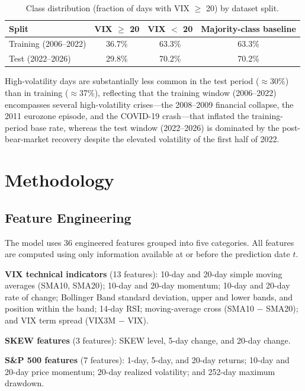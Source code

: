 \documentclass[12pt]{article}
\begin{document}
\begin{table}[H]
\centering
\caption{Class distribution (fraction of days with VIX $\geq$ 20) by dataset split.}
\label{tab:class}
\begin{tabular}{lccc}
\toprule
Split & VIX $\geq$ 20 & VIX $<$ 20 & Majority-class baseline \\
\midrule
Training (2006--2022) & 36.7\% & 63.3\% & 63.3\% \\
Test (2022--2026)     & 29.8\% & 70.2\% & 70.2\% \\
\bottomrule
\end{tabular}
\end{table}

High-volatility days are substantially less common in the test period ($\approx$30\%) than in training ($\approx$37\%), reflecting that the training window (2006--2022) encompasses several high-volatility crises---the 2008--2009 financial collapse, the 2011 eurozone episode, and the COVID-19 crash---that inflated the training-period base rate, whereas the test window (2022--2026) is dominated by the post-bear-market recovery despite the elevated volatility of the first half of 2022.

\section{Methodology}
\label{sec:methodology}

\subsection{Feature Engineering}

The model uses 36 engineered features grouped into five categories. All features are computed using only information available at or before the prediction date $t$.

\textbf{VIX technical indicators} (13 features): 10-day and 20-day simple moving averages (SMA10, SMA20); 10-day and 20-day momentum; 10-day and 20-day rate of change; Bollinger Band standard deviation, upper and lower bands, and position within the band; 14-day RSI; moving-average cross (SMA10 $-$ SMA20); and VIX term spread (VIX3M $-$ VIX).

\textbf{SKEW features} (3 features): SKEW level, 5-day change, and 20-day change.

\textbf{S\&P 500 features} (7 features): 1-day, 5-day, and 20-day returns; 10-day and 20-day price momentum; 20-day realized volatility; and 252-day maximum drawdown.
\end{document}
